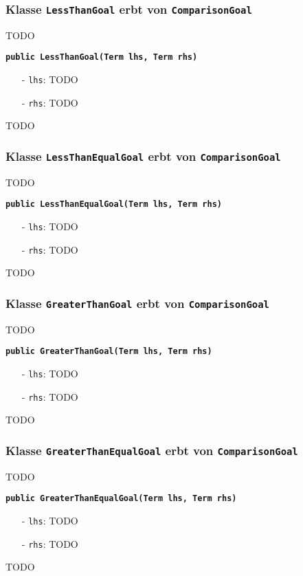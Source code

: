 \documentclass[parskip=full,11pt,twoside]{scrartcl}
\begin{document}
\subsubsection{Klasse \texttt{LessThanGoal} erbt von \texttt{ComparisonGoal}}
TODO

\textbf{\texttt{public LessThanGoal(Term lhs, Term rhs)}}
\begin{itemize}[noitemsep]
	\item[-] \texttt{lhs}: TODO
	\item[-] \texttt{rhs}: TODO
\end{itemize}
TODO

\subsubsection{Klasse \texttt{LessThanEqualGoal} erbt von \texttt{ComparisonGoal}}
TODO

\textbf{\texttt{public LessThanEqualGoal(Term lhs, Term rhs)}}
\begin{itemize}[noitemsep]
	\item[-] \texttt{lhs}: TODO
	\item[-] \texttt{rhs}: TODO
\end{itemize}
TODO

\subsubsection{Klasse \texttt{GreaterThanGoal} erbt von \texttt{ComparisonGoal}}
TODO

\textbf{\texttt{public GreaterThanGoal(Term lhs, Term rhs)}}
\begin{itemize}[noitemsep]
	\item[-] \texttt{lhs}: TODO
	\item[-] \texttt{rhs}: TODO
\end{itemize}
TODO

\subsubsection{Klasse \texttt{GreaterThanEqualGoal} erbt von \texttt{ComparisonGoal}}
TODO

\textbf{\texttt{public GreaterThanEqualGoal(Term lhs, Term rhs)}}
\begin{itemize}[noitemsep]
	\item[-] \texttt{lhs}: TODO
	\item[-] \texttt{rhs}: TODO
\end{itemize}
TODO
\end{document}
